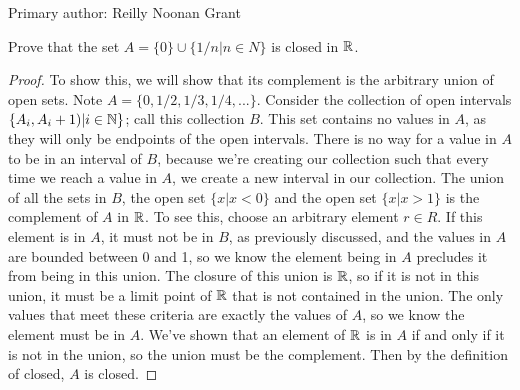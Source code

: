 Primary author: Reilly Noonan Grant

\begin{minorEx} %
Prove that the set $A = \{0\} \cup \{1/n | n \in N\}$ is closed in $\mathbb{R}$.
\end{minorEx}

\begin{proof}
To show this, we will show that its complement is the arbitrary union
of open sets. Note $A=\{0, 1/2, 1/3, 1/4, ...\}$. Consider the
collection of open intervals $\{A_i, A_i+1) | i \in \mathbb{N} \}$; call this
collection $B$. This set contains no values in $A$, as they will only
be endpoints of the open intervals. There is no way for a value in $A$
to be in an interval of $B$, because we're creating our collection
such that every time we reach a value in $A$, we create a new interval
in our collection. The union of all the sets in $B$, the open set $\{x
| x < 0\}$ and the open set $\{x | x > 1\}$ is the complement of $A$ in
$\mathbb{R}$. To see this, choose an arbitrary element $r \in R$. If this element is in $A$, it must not be in $B$, as previously discussed, and the values in $A$ are bounded between 0 and 1, so we know the element being in $A$ precludes it from being in this union. The closure of this union is $\mathbb{R}$, so if it is not in this union, it must be a limit point of $\mathbb{R}$ that is not contained in the union. The only values that meet these criteria are exactly the values of $A$, so we know the element must be in $A$. We've shown that an element of $\mathbb{R}$ is in $A$ if and only if it is not in the union, so the union must be the complement. Then by the definition of closed, $A$ is closed.
\end{proof}